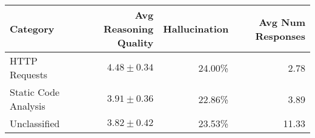 \begin{tabular}{lrrr}
\toprule
Category & Avg Reasoning Quality & Hallucination & Avg Num Responses \\
\midrule
HTTP Requests & \( 4.48 \pm 0.34 \) & 24.00\% & 2.78 \\
Static Code Analysis & \( 3.91 \pm 0.36 \) & 22.86\% & 3.89 \\
Unclassified & \( 3.82 \pm 0.42 \) & 23.53\% & 11.33 \\
\bottomrule
\end{tabular}
